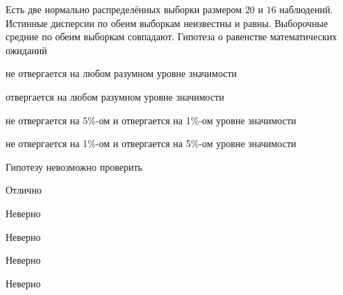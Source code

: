 
\begin{question}
Есть две нормально распределённых выборки размером \(20\) и \(16\)
наблюдений. Истинные дисперсии по обеим выборкам неизвестны и равны.
Выборочные средние по обеим выборкам совпадают. Гипотеза о равенстве
математических ожиданий
\begin{answerlist}
  \item не отвергается на любом разумном уровне значимости
  \item отвергается на любом разумном уровне значимости
  \item не отвергается на 5\%-ом и отвергается на 1\%-ом уровне значимости
  \item не отвергается на 1\%-ом и отвергается на 5\%-ом уровне значимости
  \item Гипотезу невозможно проверить
\end{answerlist}
\end{question}

\begin{solution}
\begin{answerlist}
  \item Отлично
  \item Неверно
  \item Неверно
  \item Неверно
  \item Неверно
\end{answerlist}
\end{solution}


